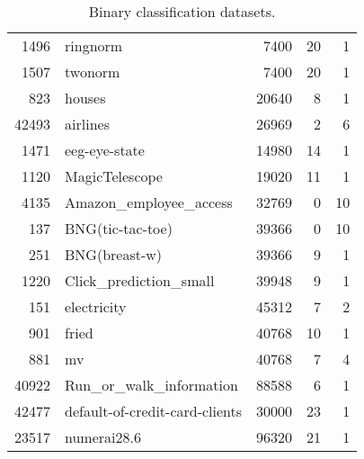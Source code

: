 \begin{table}[h!]
\begin{tabular}{rlrrr}
      1496 &                       ringnorm &         7400 &               20 &                1 \\
      1507 &                        twonorm &         7400 &               20 &                1 \\
       823 &                         houses &        20640 &                8 &                1 \\
     42493 &                       airlines &        26969 &                2 &                6 \\
      1471 &                  eeg-eye-state &        14980 &               14 &                1 \\
      1120 &                 MagicTelescope &        19020 &               11 &                1 \\
      4135 &         Amazon\_employee\_access &        32769 &                0 &               10 \\
       137 &               BNG(tic-tac-toe) &        39366 &                0 &               10 \\
       251 &                  BNG(breast-w) &        39366 &                9 &                1 \\
      1220 &         Click\_prediction\_small &        39948 &                9 &                1 \\
       151 &                    electricity &        45312 &                7 &                2 \\
       901 &                          fried &        40768 &               10 &                1 \\
       881 &                             mv &        40768 &                7 &                4 \\
     40922 &        Run\_or\_walk\_information &        88588 &                6 &                1 \\
     42477 & default-of-credit-card-clients &        30000 &               23 &                1 \\
     23517 &                    numerai28.6 &        96320 &               21 &                1 \\
\bottomrule
\end{tabular}
\caption{Binary classification datasets.}
\label{tab:binary_data}
\end{table}
